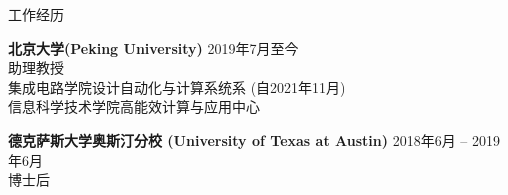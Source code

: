 
\begin{rSection}{工作经历}

{\bf 北京大学(Peking University)}                           \hfill {2019年7月至今} \\
助理教授 \\
集成电路学院设计自动化与计算系统系 (自2021年11月) \\
信息科学技术学院高能效计算与应用中心

{\bf 德克萨斯大学奥斯汀分校 (University of Texas at Austin)} \hfill {2018年6月 -- 2019年6月} \\
博士后

%
%
%
%


\end{rSection}


